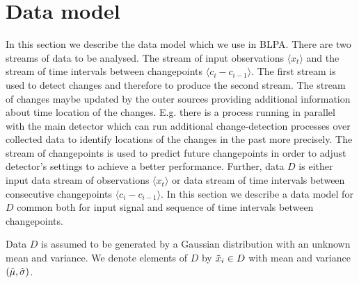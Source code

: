 \section{Data model}
\label{sec:data_model}
In this section we describe the data model which we use in BLPA.
There are two streams of data to be analysed.
The stream of input observations $\langle x_t \rangle$ and the stream of time intervals between changepoints  $\langle c_i - c_{i-1} \rangle$.
The first stream is used to detect changes and therefore to produce the second stream.
The stream of changes maybe updated by the outer sources providing additional information about time location of the changes.
E.g. there is a process running in parallel with the main detector which can run additional change-detection processes over collected data to identify locations of the changes in the past more precisely.
%
The stream of changepoints is used to predict future changepoints in order to adjust detector's settings to achieve a better performance.
%
Further, data $D$ is either input data stream of observations $\langle x_t \rangle$ or data stream of time intervals between consecutive changepoints $\langle c_i - c_{i-1} \rangle$.
In this section we describe a data model for $D$ common both for input signal and sequence of time intervals between changepoints.

Data $D$ is assumed to be generated by a Gaussian distribution with an unknown mean and variance.
We denote elements of $D$ by $\tilde{x}_i \in D$ with mean and variance $(\tilde{\mu}, \tilde{\sigma})$.

